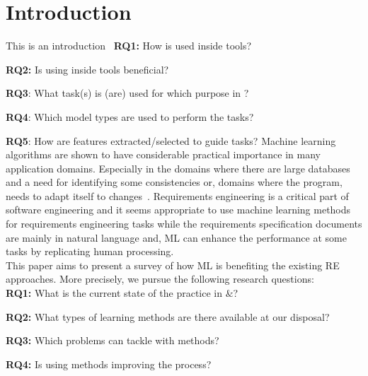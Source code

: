 \section{Introduction}

This is an introduction~\cite{Domingos:2015}
\noindent
\textbf{RQ1:} How is \ML used inside \RE tools?

\noindent
\textbf{RQ2:} Is using \ML inside \RE tools beneficial?

\noindent
\textbf{RQ3}: What \ML task(s) is (are) used for which purpose in \RE?

\noindent
\textbf{RQ4}: Which model types are used to perform the \RE tasks?

\noindent
\textbf{RQ5}: How are \ML features extracted/selected to guide \RE tasks?
Machine learning algorithms are shown to have considerable practical importance in many application domains. Especially in the domains where there are large databases and a need for identifying some consistencies or, domains where the program, needs to adapt itself to changes~\cite{Zhang2002}. Requirements engineering is a critical part of software engineering and it seems appropriate to use machine learning methods for requirements engineering tasks while the requirements specification documents are mainly in natural language and, ML can enhance the performance at some tasks by replicating human processing. \\
This paper aims to present a survey of how ML is benefiting the existing RE approaches. More precisely, we pursue the following research questions: \\
\noindent
\textbf{RQ1:} What is the current state of the practice in \ML${\&}$\RE?

\noindent
\textbf{RQ2:} What types of learning methods are there available at our disposal?

\noindent
\textbf{RQ3:} Which \RE problems can tackle with \ML methods?

\noindent
\textbf{RQ4:} Is using \ML methods improving the \RE process?


